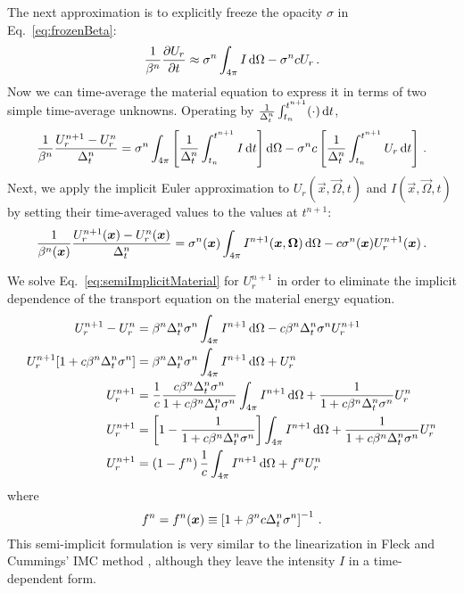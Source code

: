 The next approximation is to explicitly freeze the opacity $\sigma$ in
Eq.~\eqref{eq:frozenBeta}:
\begin{equation*}
  \frac{1}{\beta^n}
  \frac{\partial U_r}{\partial t} \approx \sigma^n \int_{4\pi}  I \mathop{}\!\mathrm{d} \Omega - \sigma^n c U_r \,.
\end{equation*}
Now we can time-average the material equation to express it in terms of two
simple time-average unknowns. Operating by
$\frac{1}{\Delta_t^n}\int_{t_n}^{t^{n+1}} (\cdot) \mathop{}\!\mathrm{d} t$,
\begin{equation*}
  \frac{1}{\beta^n}
  \frac{U_r^{n+1} - U_r^n}{\Delta_t^n} = \sigma^n \int_{4\pi} \left[
  \frac{1}{\Delta_t^n}\int_{t_n}^{t^{n+1}} I\mathop{}\!\mathrm{d} t
  \right] \mathop{}\!\mathrm{d} \Omega - \sigma^n c \left[
  \frac{1}{\Delta_t^n}\int_{t_n}^{t^{n+1}} U_r \mathop{}\!\mathrm{d} t \right]\,.
\end{equation*}
Next, we apply the implicit Euler approximation to $U_r(\vec{x}, \vec{\Omega},
t)$ and $I(\vec{x}, \vec{\Omega}, t)$ by setting their time-averaged values to
the values at $t^{n+1}$:
\begin{equation} \label{eq:semiImplicitMaterial}
  \frac{1}{\beta^n(\bm{x})}
  \frac{U_r^{n+1}(\bm{x}) - U_r^n(\bm{x})}{\Delta_t^n}
  = \sigma^n(\bm{x}) \int_{4\pi} I^{n+1}(\bm{x}, \bm{\Omega})\mathop{}\!\mathrm{d} \Omega
  - c \sigma^n(\bm{x}) U_r^{n+1}(\bm{x}) \,.
\end{equation}

We solve Eq.~\eqref{eq:semiImplicitMaterial} for $U_r^{n+1}$ in order to
eliminate the implicit dependence of the transport equation on the material
energy equation.
\begin{align} \nonumber
  U_r^{n+1} - U_r^n
  &= \beta^n \Delta_t^n \sigma^n\int_{4\pi} I^{n+1}\mathop{}\!\mathrm{d} \Omega
   - c \beta^n \Delta_t^n \sigma^n U_r^{n+1}
   \\ \nonumber
  U_r^{n+1} [ 1 + c \beta^n \Delta_t^n \sigma^n ]
  &= \beta^n \Delta_t^n \sigma^n\int_{4\pi} I^{n+1}\mathop{}\!\mathrm{d} \Omega + U_r^n
   \\ \nonumber
  U_r^{n+1}
  &= \frac1c \frac{ c \beta^n \Delta_t^n \sigma^n }{ 1 + c \beta^n \Delta_t^n \sigma^n}
  \int_{4\pi} I^{n+1}\mathop{}\!\mathrm{d} \Omega + \frac1{ 1 + c \beta^n \Delta_t^n \sigma^n}
  U_r^n
  \\ \nonumber
  U_r^{n+1}
  &= \left[1 - \frac{1 }{ 1 + c \beta^n \Delta_t^n \sigma^n} \right]
  \int_{4\pi} I^{n+1}\mathop{}\!\mathrm{d} \Omega + \frac1{ 1 + c \beta^n \Delta_t^n \sigma^n}
  U_r^n
  \\ \label{eq:urNPlusOne}
  U_r^{n+1}
  &= \left(1 - f^n\right) \frac1c \int_{4\pi} I^{n+1}\mathop{}\!\mathrm{d} \Omega + f^n U_r^n
\end{align}
where
\begin{equation} \label{eq:fleckFactor}
  f^n = f^n(\bm{x}) \equiv \left[ 1 + \beta^n c \Delta_t^n \sigma^n
  \right]^{-1} \,.
\end{equation}
This semi-implicit formulation is very similar to the linearization in Fleck
and Cummings' IMC method \cite{Fle1971}, although they leave the intensity $I$
in a time-dependent form.

